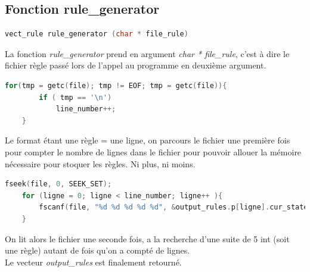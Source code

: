 \documentclass[12pt,a4paper]{report}
\begin{document}
\subsection{Fonction rule\_generator}
\begin{lstlisting}[language=c]
vect_rule rule_generator (char * file_rule)
\end{lstlisting}
La fonction \textit{rule\_generator} prend en argument \textit{char * file\_rule}, c'est à dire le fichier règle passé lors de l'appel au programme en deuxième argument.
\begin{lstlisting}[language=c]
for(tmp = getc(file); tmp != EOF; tmp = getc(file)){
		if ( tmp == '\n')
			line_number++;
	}
\end{lstlisting}
Le format étant une règle = une ligne, on parcours le fichier une première fois pour compter le nombre de lignes dans le fichier pour pouvoir allouer la mémoire nécessaire pour stoquer les règles. Ni plus, ni moins.
\begin{lstlisting}[language=c]
fseek(file, 0, SEEK_SET);
	for (ligne = 0; ligne < line_number; ligne++ ){
		fscanf(file, "%d %d %d %d %d", &output_rules.p[ligne].cur_state, &output_rules.p[ligne].symbol, &output_rules.p[ligne].new_symbol, &output_rules.p[ligne].direction, &output_rules.p[ligne].new_state);
	}
\end{lstlisting}
On lit alors le fichier une seconde fois, a la recherche d'une suite de 5 int (soit une règle) autant de fois qu'on a compté de lignes.\\
Le vecteur \textit{output\_rules} est finalement retourné.
\end{document}
